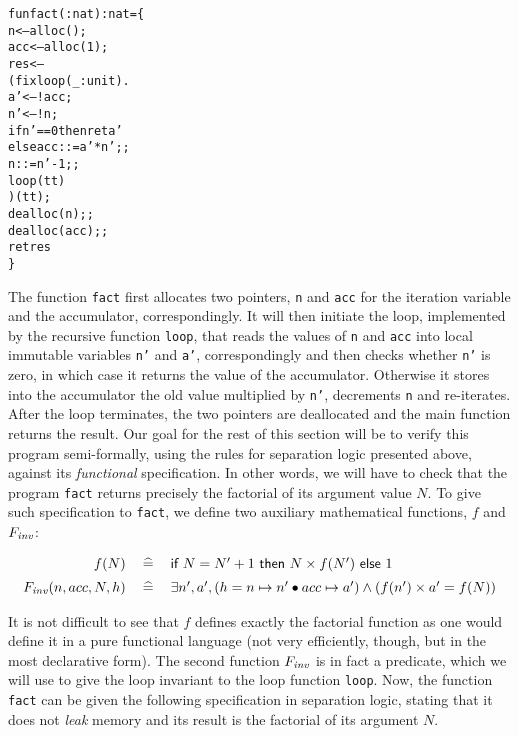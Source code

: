 \label{ref:facto}
\begin{alltt}
fun fact ( : nat): nat = \{
  n   <-- alloc();
  acc <-- alloc(1); 
  res <-- 
    (fix loop (_ : unit). 
      a' <-- !acc;
      n' <-- !n;
      if n' == 0 then ret a'
      else acc ::= a' * n';;
           n   ::= n' - 1;;
           loop(tt) 
    )(tt);
  dealloc(n);;
  dealloc(acc);;
  ret res
\}
\end{alltt}

The function \texttt{fact} first allocates two pointers,
\texttt{n} and \texttt{acc} for the iteration variable and the
accumulator, correspondingly. It will then initiate the loop,
implemented by the recursive function \texttt{loop}, that reads the
values of \texttt{n} and \texttt{acc} into local immutable
variables \texttt{n'} and \texttt{a'}, correspondingly and then
checks whether \texttt{n'} is zero, in which case it returns the
value of the accumulator. Otherwise it stores into the accumulator the
old value multiplied by \texttt{n'}, decrements \texttt{n} and
re-iterates. After the loop terminates, the two pointers are
deallocated and the main function returns the result.
Our goal for the rest of this section will be to verify this program
semi-formally, using the rules for separation logic presented above,
against its \textit{functional} specification. In other words, we will have
to check that the program \texttt{fact} returns precisely the
factorial of its argument value $N$. To give such specification to
\texttt{fact}, we define two auxiliary mathematical functions, $f$
and $F_{\mathit{inv}}$:

\[
\begin{array}{rcl}
f(N) & \mathrel{\:\widehat{=}\:} & \textsf{if}~N = N'+1~\textsf{then}~N \times f(N')~\textsf{else}~1 
\\[5pt]
F_{\mathit{inv}}(n, acc, N, h) & \mathrel{\:\widehat{=}\:} &  \exists n', a', (h = n \mapsto n' \bullet acc \mapsto a') \wedge (f(n') \times a' = f(N))
\end{array}
\]

It is not difficult to see that $f$ defines exactly the factorial
function as one would define it in a pure functional language (not
very efficiently, though, but in the most declarative form). The
second function $F_{\mathit{inv}}$ is in fact a predicate, which we will use to
give the loop invariant to the loop function \texttt{loop}. Now, the
function \texttt{fact} can be given the following specification in
separation logic, stating that it does not \textit{leak} memory and its
result is the factorial of its argument $N$.

